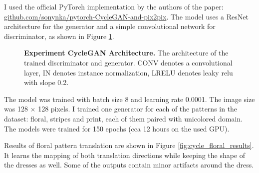 \documentclass[12pt]{report}
\begin{document}
I used the official PyTorch implementation by the authors of the paper: \linebreak \hyperlink{https://github.com/sonynka/pytorch-CycleGAN-and-pix2pix}{github.com/sonynka/pytorch-CycleGAN-and-pix2pix}. The model uses a ResNet architecture for the generator and a simple convolutional network for discriminator, as shown in Figure \ref{fig:cyclegan_arch}.

\begin{figure}[h]
\centering
{}\vspace{.5cm}
\caption{\label{fig:cyclegan_arch} \textbf{Experiment CycleGAN Architecture.} The architecture of the trained  discriminator and generator. CONV denotes a convolutional layer, IN denotes instance normalization, LRELU denotes leaky relu with slope 0.2.}
\end{figure}

The model was trained with batch size 8 and learning rate 0.0001. The image size was 128 $\times$ 128 pixels. I trained one generator for each of the patterns in the dataset: floral, stripes and print, each of them paired with unicolored domain. The models were trained for 150 epochs (cca 12 hours on the used GPU). 

Results of floral pattern translation are shown in Figure \ref{fig:cycle_floral_results}. It learns the mapping of both translation directions while keeping the shape of the dresses as well. Some of the outputs contain minor artifacts around the dress.
\end{document}
